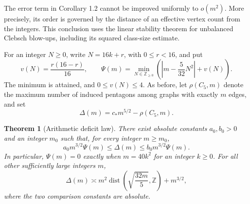\documentclass[11pt]{amsart}
\newtheorem{theorem}{Theorem}[section]
\theoremstyle{definition}
\theoremstyle{remark}
\begin{document}
The error term in Corollary 1.2 cannot be improved uniformly to $o(m^2)$.
More precisely, its order is governed by the distance of an effective vertex
count from the integers. This conclusion uses the linear stability theorem
for unbalanced Clebsch blow-ups, including its squared class-size estimate.

For an integer $N\geq0$, write $N=16k+r$, with $0\leq r<16$, and put
\[
 v(N)=\frac{r(16-r)}{16},\qquad
 \Psi(m)=\min_{N\in\mathbb Z_{\geq0}}
 \left(\left|m-\frac5{32}N^2\right|+v(N)\right).
\]
The minimum is attained, and $0\leq v(N)\leq4$. As before, let
$\rho(C_5,m)$ denote the maximum number of induced pentagons among graphs
with exactly $m$ edges, and set
\[
 \Delta(m)=c_\ast m^{5/2}-\rho(C_5,m).
\]

\begin{theorem}[Arithmetic deficit law]\label{thm:arithmetic-deficit}
There exist absolute constants $a_0,b_0>0$ and an integer $m_0$ such that,
for every integer $m\geq m_0$,
\begin{equation}\tag{51}\label{eq:51}
 a_0m^{3/2}\Psi(m)\leq\Delta(m)\leq b_0m^{3/2}\Psi(m).
\end{equation}
In particular, $\Psi(m)=0$ exactly when $m=40k^2$ for an integer $k\geq0$.
For all other sufficiently large integers $m$,
\begin{equation}\tag{52}\label{eq:52}
 \Delta(m)\asymp m^2\operatorname{dist}
 \left(\sqrt{\frac{32m}5},\mathbb Z\right)+m^{3/2},
\end{equation}
where the two comparison constants are absolute.
\end{theorem}
\end{document}
